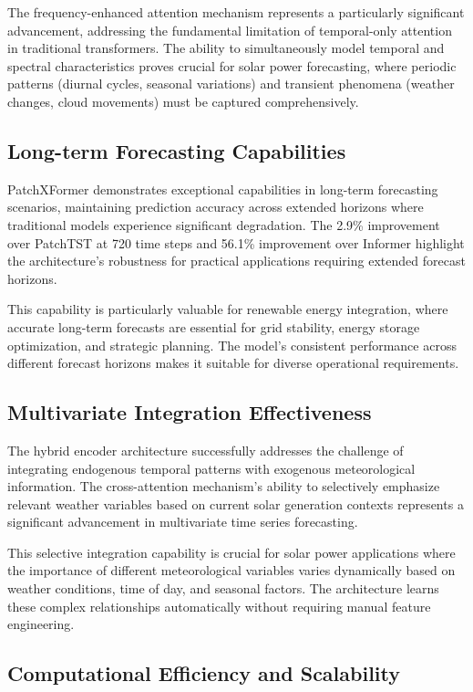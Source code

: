 \documentclass[12pt]{uomthesis}
\begin{document}
The frequency-enhanced attention mechanism represents a particularly significant advancement, addressing the fundamental limitation of temporal-only attention in traditional transformers. The ability to simultaneously model temporal and spectral characteristics proves crucial for solar power forecasting, where periodic patterns (diurnal cycles, seasonal variations) and transient phenomena (weather changes, cloud movements) must be captured comprehensively.

\subsection{Long-term Forecasting Capabilities}

PatchXFormer demonstrates exceptional capabilities in long-term forecasting scenarios, maintaining prediction accuracy across extended horizons where traditional models experience significant degradation. The 2.9\% improvement over PatchTST at 720 time steps and 56.1\% improvement over Informer highlight the architecture's robustness for practical applications requiring extended forecast horizons.

This capability is particularly valuable for renewable energy integration, where accurate long-term forecasts are essential for grid stability, energy storage optimization, and strategic planning. The model's consistent performance across different forecast horizons makes it suitable for diverse operational requirements.

\subsection{Multivariate Integration Effectiveness}

The hybrid encoder architecture successfully addresses the challenge of integrating endogenous temporal patterns with exogenous meteorological information. The cross-attention mechanism's ability to selectively emphasize relevant weather variables based on current solar generation contexts represents a significant advancement in multivariate time series forecasting.

This selective integration capability is crucial for solar power applications where the importance of different meteorological variables varies dynamically based on weather conditions, time of day, and seasonal factors. The architecture learns these complex relationships automatically without requiring manual feature engineering.

\subsection{Computational Efficiency and Scalability}
\end{document}
